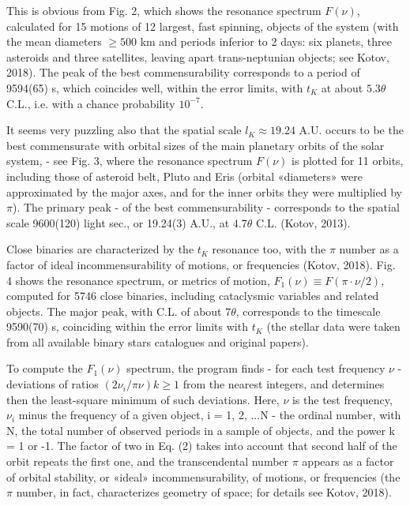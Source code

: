 \documentclass[twoside,draft]{article}
\begin{document}
\begin{sloppypar}
This is obvious from Fig. 2, which shows the resonance spectrum $F( \nu )$, calculated for 15 motions of 12 largest, fast spinning, objects of the system (with the mean diameters $\geq 500$ km and periods inferior to 2 days: six planets, three asteroids and three satellites, leaving apart trans-neptunian objects; see Kotov, 2018). The peak of the best commensurability corresponds to a period of 9594(65) s, which coincides well, within the error limits, with $t_K$ at about $5.3 \theta$ C.L., i.e. with a chance probability $10^{-7}$.

It seems very puzzling also that the spatial scale $l_{K} \approx 19.24$ A.U. occurs to be the best commensurate with orbital sizes of the main planetary orbits of the solar system, - see Fig. 3, where the resonance spectrum $F( \nu )$ is plotted for 11 orbits, including those of asteroid belt, Pluto and Eris (orbital «diameters» were approximated by the major axes, and for the inner orbits they were multiplied by $\pi$). The primary peak - of the best commensurability - corresponds to the spatial scale 9600(120) light sec., or 19.24(3) A.U., at $4.7 \theta$ C.L. (Kotov, 2013).

Close binaries are characterized by the $t_{K}$ resonance too, with the $\pi$ number as a factor of ideal incommensurability of motions, or frequencies (Kotov, 2018). Fig. 4 shows the resonance spectrum, or metrics of motion, $F_{1} (\nu) \equiv F(\pi \cdot \nu/2)$, computed for 5746 close binaries, including cataclysmic variables and related objects. The major peak, with C.L. of about $7 \theta$, corresponds to the timescale 9590(70) s, coinciding within the error limits with $t_{K}$ (the stellar data were taken from all available binary stars catalogues and original papers).

To compute the $F_{1} (\nu)$ spectrum, the program finds - for each test frequency $\nu$ - deviations of ratios $(2\nu_{i} /\pi \nu) k \geq 1$ from the nearest integers, and determines then the least-square minimum of such deviations. Here, $\nu$ is the test frequency, $\nu_{i}$ minus the frequency of a given object, i = 1, 2, ...N - the ordinal number, with N, the total number of observed periods in a sample of objects, and the power k = 1 or -1. The factor of two in Eq. (2) takes into account that second half of the orbit repeats the first one, and the transcendental number $\pi$ appears as a factor of orbital stability, or «ideal» incommensurability, of motions, or frequencies (the $\pi$ number, in fact, characterizes geometry of space; for details see Kotov, 2018).


\end{sloppypar}
\end{document}
